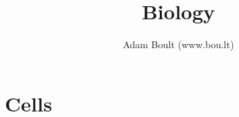 \documentclass[oneside]{book}
\begin{document}
\author{Adam Boult (www.bou.lt)}
\title{Biology}
\maketitle

\setcounter{tocdepth}{1}
\tableofcontents



\part{Cells}




\end{document}
